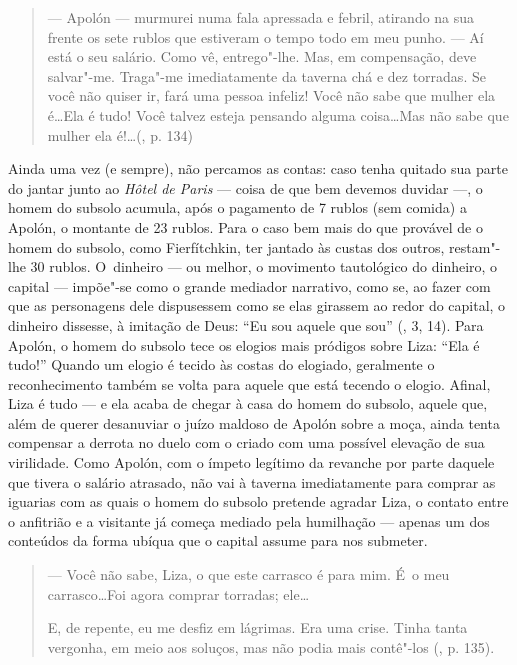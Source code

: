 \begin{quote}
--- Apolón --- murmurei numa fala apressada e febril, atirando na sua
frente os sete rublos que estiveram o tempo todo em meu punho. --- Aí
está o seu salário. Como vê, entrego"-lhe. Mas, em compensação, deve
salvar"-me. Traga"-me imediatamente da taverna chá e dez torradas. Se você
não quiser ir, fará uma pessoa infeliz! Você não sabe que mulher ela
é\ldots Ela é tudo! Você talvez esteja pensando alguma coisa\ldots Mas não
sabe que mulher ela é!\ldots (, p. 134)
\end{quote}

Ainda uma vez (e sempre), não percamos as contas: caso tenha quitado sua
parte do jantar junto ao \emph{Hôtel de Paris} --- coisa de que bem
devemos duvidar ---, o homem do subsolo acumula, após o pagamento de 7
rublos (sem comida) a Apolón, o montante de 23 rublos. Para o caso bem
mais do que provável de o homem do subsolo, como Fierfítchkin, ter
jantado às custas dos outros, restam"-lhe 30 rublos. O~dinheiro --- ou
melhor, o movimento tautológico do dinheiro, o capital --- impõe"-se como
o grande mediador narrativo, como se, ao fazer com que as personagens
dele dispusessem como se elas girassem ao redor do capital, o dinheiro
dissesse, à imitação de Deus: ``Eu sou aquele que sou'' (, 3, 14).
Para Apolón, o homem do subsolo tece os elogios mais pródigos sobre
Liza: ``Ela é tudo!'' Quando um elogio é tecido às costas do elogiado,
geralmente o reconhecimento também se volta para aquele que está tecendo
o elogio. Afinal, Liza é tudo --- e ela acaba de chegar à casa do homem
do subsolo, aquele que, além de querer desanuviar o juízo maldoso de
Apolón sobre a moça, ainda tenta compensar a derrota no duelo com o
criado com uma possível elevação de sua virilidade. Como Apolón, com o
ímpeto legítimo da revanche por parte daquele que tivera o salário
atrasado, não vai à taverna imediatamente para comprar as iguarias com
as quais o homem do subsolo pretende agradar Liza, o contato entre o
anfitrião e a visitante já começa mediado pela humilhação --- apenas um
dos conteúdos da forma ubíqua que o capital assume para nos submeter.

\begin{quote}
--- Você não sabe, Liza, o que este carrasco é para mim. É~o meu
carrasco\ldots Foi agora comprar torradas; ele\ldots

\noindent E, de repente, eu me desfiz em lágrimas. Era uma crise. Tinha tanta
vergonha, em meio aos soluços, mas não podia mais contê"-los (, p.
135).
\end{quote}

